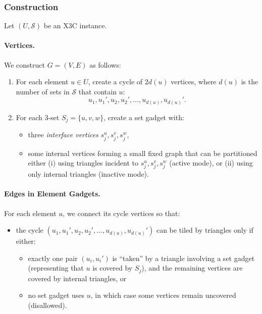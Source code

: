 \documentclass[9pt]{extarticle}
\begin{document}
\subsubsection*{Construction}

Let $(U,\mathcal{S})$ be an X3C instance.

\paragraph{Vertices.}
We construct $G = (V,E)$ as follows:

\begin{enumerate}
    \item For each element $u \in U$, create a cycle of $2d(u)$ vertices, where
          $d(u)$ is the number of sets in $\mathcal{S}$ that contain $u$:
          \[
              u_1, u_1', u_2, u_2', \dots, u_{d(u)}, u_{d(u)}'.
          \]
    \item For each 3-set $S_j = \{u, v, w\}$, create a set gadget with:
          \begin{itemize}
              \item three \emph{interface vertices} $s_j^u, s_j^v, s_j^w$,
              \item some internal vertices forming a small fixed graph that can
                    be partitioned either (i) using triangles incident to
                    $s_j^u, s_j^v, s_j^w$ (active mode), or (ii) using only
                    internal triangles (inactive mode).
          \end{itemize}
\end{enumerate}

\paragraph{Edges in Element Gadgets.}
For each element $u$, we connect its cycle vertices so that:
\begin{itemize}
    \item the cycle $(u_1,u_1',u_2,u_2',\dots,u_{d(u)},u_{d(u)}')$ can be tiled
          by triangles only if either:
          \begin{itemize}
              \item exactly one pair $(u_i, u_i')$ is “taken” by a triangle involving
                    a set gadget (representing that $u$ is covered by $S_j$), and
                    the remaining vertices are covered by internal triangles, or
              \item no set gadget uses $u$, in which case some vertices remain
                    uncovered (disallowed).
          \end{itemize}
\end{itemize}
\end{document}
